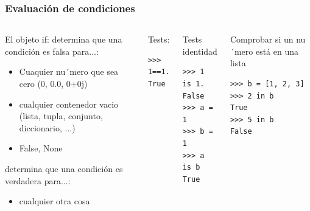 \documentclass[10pt,colorlinks]{beamer}
\begin{document}
\begin{frame}[fragile]\frametitle{Evaluación de condiciones}
\begin{columns}[c]
\tiny
\begin{block}{El objeto if:}
determina que una condición es falsa para...:
\begin{itemize}
    \item Cuaquier nu´mero que sea cero (0, 0.0, 0+0j)
\item cualquier contenedor vacio (lista, tupla, conjunto, diccionario, ...)
\item False, None
\end{itemize}  
determina que una condición es verdadera para...:
\begin{itemize}
    \item cualquier otra cosa
\end{itemize}
\end{block}

\begin{block}{Tests:}
\begin{verbatim}
>>> 1==1.
True
\end{verbatim}

\end{block}


\tiny
\begin{block}{Tests identidad}
\begin{verbatim}
>>> 1 is 1.
False
>>> a = 1
>>> b = 1
>>> a is b
True
\end{verbatim}

\end{block}
\begin{block}{Comprobar si un nu´mero está en una lista}
\begin{verbatim}
>>> b = [1, 2, 3]
>>> 2 in b
True
>>> 5 in b
False
\end{verbatim}

\end{block}

\end{columns}
\end{frame}
\end{document}
